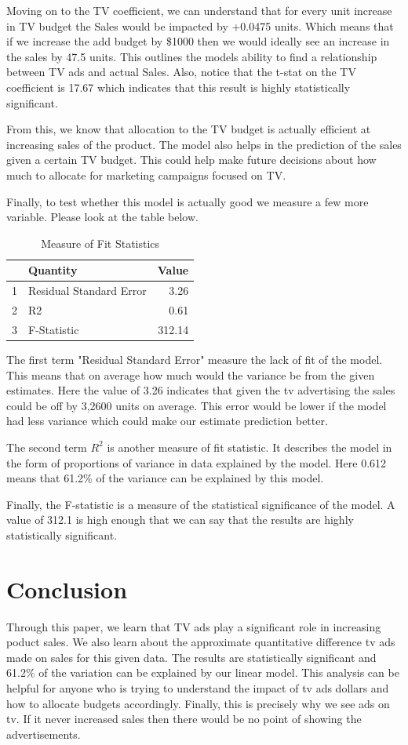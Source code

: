\documentclass{article}
\begin{document}
Moving on to the TV coefficient, we can understand that for every unit increase in TV budget the Sales would be impacted by +0.0475 units. Which means that if we increase the add budget by \$1000 then we would ideally see an increase in the sales by 47.5 units. This outlines the models ability to find a relationship between TV ads and actual Sales. Also, notice that the t-stat on the TV coefficient is 17.67 which indicates that this result is highly statistically significant.

From this, we know that allocation to the TV budget is actually efficient at increasing sales of the product. The model also helps in the prediction of the sales given a certain TV budget. This could help make future decisions about how much to allocate for marketing campaigns focused on TV.

Finally, to test whether this model is actually good we measure a few more variable. Please look at the table below.
\begin{table}[ht]
\centering
\begin{tabular}{rlr}
  \hline
 & Quantity & Value \\ 
  \hline
1 & Residual Standard Error & 3.26 \\ 
  2 & R2 & 0.61 \\ 
  3 & F-Statistic & 312.14 \\ 
   \hline
\end{tabular}
\caption{Measure of Fit Statistics} 
\end{table}
The first term "Residual Standard Error" measure the lack of fit of the model. This means that on average how much would the variance be from the given estimates. Here the value of 3.26 indicates that given the tv advertising the sales could be off by 3,2600 units on average. This error would be lower if the model had less variance which could make our estimate prediction better.

The second term $R^2$ is another measure of fit statistic. It describes the model in the form of proportions of variance in data explained by the model. Here 0.612 means that 61.2\% of the variance can be explained by this model.

Finally, the F-statistic is a measure of the statistical significance of the model. A value of 312.1 is high enough that we can say that the results are highly statistically significant.


\section{Conclusion}
Through this paper, we learn that TV ads play a significant role in increasing poduct sales. We also learn about the approximate quantitative difference tv ads made on sales for this given data. The results are statistically significant and 61.2\% of the variation can be explained by our linear model. This analysis can be helpful for anyone who is trying to understand the impact of tv ads dollars and how to allocate budgets accordingly. Finally, this is precisely why we see ads on tv. If it never increased sales then there would be no point of showing the advertisements. 
\end{document}
